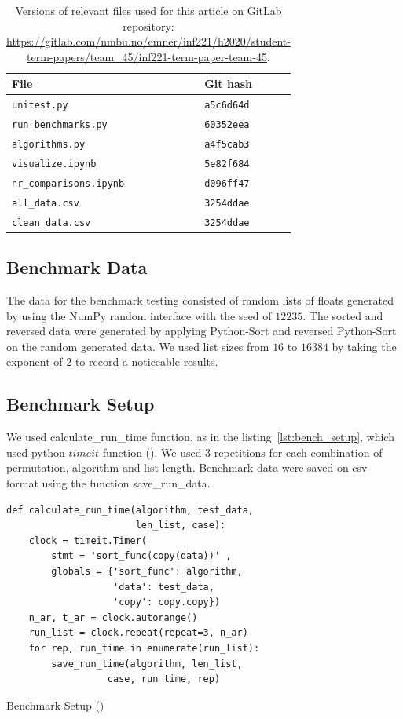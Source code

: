\documentclass[sigconf, nonacm, natbib, screen, balance=False]{acmart}
\begin{document}
\begin{table}
  \caption{Versions of relevant files used for this article on GitLab repository:
    \url{https://gitlab.com/nmbu.no/emner/inf221/h2020/student-term-papers/team_45/inf221-term-paper-team-45}.}
  \label{tbl:hashes}
  \begin{tabular}{ll}  
    \hline
    File & Git hash \\\hline
    \verb!unitest.py! & \verb!a5c6d64d! \\
    \verb!run_benchmarks.py! & \verb!60352eea! \\
    \verb!algorithms.py! & \verb!a4f5cab3! \\
    \verb!visualize.ipynb! & \verb!5e82f684! \\
    \verb!nr_comparisons.ipynb! & \verb!d096ff47! \\
    \verb!all_data.csv! & \verb!3254ddae! \\
    \verb!clean_data.csv! & \verb!3254ddae! \\\hline
  \end{tabular}
\end{table}

\subsection{Benchmark Data}\label{sec:data}
The data for the benchmark testing consisted of random lists of floats generated by using the NumPy random interface with the seed of $12235$. The sorted and reversed data were generated by applying Python-Sort and reversed Python-Sort on the random generated data. We used list sizes from $16$ to $16384$ by taking the exponent of $2$ to record a noticeable results. 

\subsection{Benchmark Setup}\label{sec:setup}
We used calculate\_run\_time function, as in the listing~\ref{lst:bench_setup}, which used python $timeit$ function (\citet{PythonDocumentation}). We used $3$ repetitions for each combination of permutation, algorithm and list length. Benchmark data were saved on csv format using the function save\_run\_data.

\begin{listing}
  \begin{lstlisting}
def calculate_run_time(algorithm, test_data, 
                       len_list, case):
    clock = timeit.Timer(
        stmt = 'sort_func(copy(data))' ,
        globals = {'sort_func': algorithm,
                   'data': test_data,
                   'copy': copy.copy})
    n_ar, t_ar = clock.autorange()
    run_list = clock.repeat(repeat=3, n_ar)
    for rep, run_time in enumerate(run_list):
        save_run_time(algorithm, len_list, 
                  case, run_time, rep)
  \end{lstlisting}
   \caption{Benchmark Setup (\citet{hansplesser})}
  \label{lst:bench_setup}
\end{listing}
\end{document}
